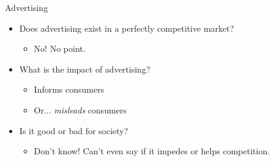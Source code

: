 \documentclass[aspectratio=169]{beamer}
\begin{document}
\begin{frame}{Advertising}
    \begin{itemize}
        \item Does advertising exist in a perfectly competitive market?
        \begin{itemize}
            \item No! No point.
        \end{itemize}
        \item What is the impact of advertising?
        \begin{itemize}
            \item Informs consumers
            \item Or... \textit{misleads} consumers
        \end{itemize} 
        \item Is it good or bad for society?
        \begin{itemize}
            \item Don't know! Can't even say if it impedes or helps competition.
        \end{itemize}
    \end{itemize}
\end{frame}
\end{document}
